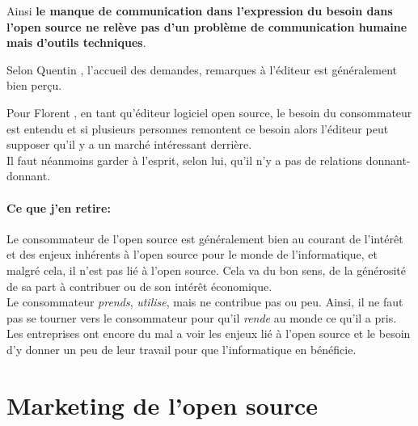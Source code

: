 			Ainsi \textbf{le manque de communication dans l'expression du besoin dans l'open source ne relève pas d'un problème de communication humaine mais d'outils techniques}.

			\newpage

			Selon Quentin , l'accueil des demandes, remarques à l'éditeur est généralement bien perçu.

			\begin{center}
				\textit{
				}
			\end{center}

			Pour Florent , en tant qu'éditeur logiciel open source, le besoin du consommateur est entendu et si plusieurs personnes remontent ce besoin alors l'éditeur peut supposer qu'il y a un marché intéressant derrière.\\

			Il faut néanmoins garder à l'esprit, selon lui, qu'il n'y a pas de relations donnant-donnant.

			\begin{center}
				\textit{
				}
			\end{center}

		\paragraph{Ce que j'en retire:\\}

		Le consommateur de l'open source est généralement bien au courant de l'intérêt et des enjeux inhérents à l'open source pour le monde de l'informatique, et malgré cela, il n'est pas lié à l'open source. Cela va du bon sens, de la générosité de sa part à contribuer ou de son intérêt économique.\\

		Le consommateur \emph{prends}, \emph{utilise}, mais ne contribue pas ou peu. Ainsi, il ne faut pas se tourner vers le consommateur pour qu'il \emph{rende} au monde ce qu'il a pris. Les entreprises ont encore du mal a voir les enjeux lié à l'open source et le besoin d'y donner un peu de leur travail pour que l'informatique en bénéficie.

	\section{Marketing de l'open source}

